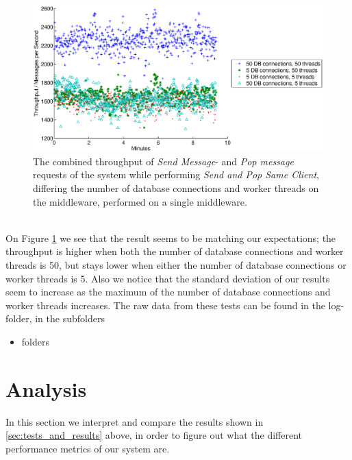 \documentclass{article}
\begin{document}
\begin{table}
\begin{table}
\begin{table}
             \begin{figure}[H]
                 \centering
                 \includegraphics[scale=0.50]{throughput_vs_dbconns}
                 \caption{The combined throughput of \textit{Send Message}- and \textit{Pop message} requests of the system while performing \textit{Send and Pop Same Client}, differing the number of database connections and worker threads on the middleware, performed on a single middleware.}
                 \label{fig:throughput_vs_dbconns}
             \end{figure}
             ~\\
             On Figure \ref{fig:throughput_vs_dbconns} we see that the result seems to be matching our expectations; the throughput is higher when both the number of database connections and worker threads is 50, but stays lower when either the number of database connections or worker threads is 5. Also we notice that the standard deviation of our results seem to increase as the maximum of the number of database connections and worker threads increases.
            The raw data from these tests can be found in the log-folder, in the subfolders
            \begin{itemize}
                \item folders
            \end{itemize}
            
    \section{Analysis}
        \label{sec:analysis}
        In this section we interpret and compare the results shown in \ref{sec:tests_and_results} above, in order to figure out what the different performance metrics of our system are.


\end{table}
\end{table}
\end{table}
\end{document}
